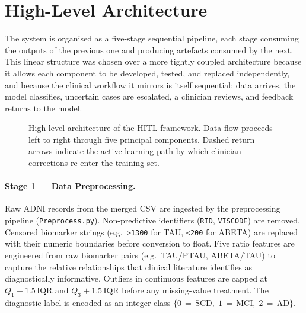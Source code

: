 \documentclass[12pt, a4paper]{report}
\begin{document}
  \section{High-Level Architecture}
  \label{sec:architecture}

  The system is organised as a five-stage sequential pipeline, each stage consuming
  the outputs of the previous one and producing artefacts consumed by the next. This
  linear structure was chosen over a more tightly coupled architecture because it
  allows each component to be developed, tested, and replaced independently, and
  because the clinical workflow it mirrors is itself sequential: data arrives, the
  model classifies, uncertain cases are escalated, a clinician reviews, and feedback
  returns to the model.

  \begin{figure}[htbp]
    \centering
    \caption{High-level architecture of the HITL framework. Data flow proceeds
    left to right through five principal components. Dashed return arrows indicate
    the active-learning path by which clinician corrections re-enter the training set.}
    \label{fig:architecture}
  \end{figure}

  \paragraph{Stage 1 — Data Preprocessing.}
  Raw ADNI records from the merged CSV are ingested by the preprocessing pipeline
  (\texttt{Preprocess.py}). Non-predictive identifiers (\texttt{RID},
  \texttt{VISCODE}) are removed. Censored biomarker strings (e.g.\ \texttt{>1300}
  for TAU, \texttt{<200} for ABETA) are replaced with their numeric boundaries before
  conversion to float. Five ratio features are engineered from raw biomarker pairs
  (e.g.\ TAU/PTAU, ABETA/TAU) to capture the relative relationships that clinical
  literature identifies as diagnostically informative. Outliers in continuous features
  are capped at $Q_1 - 1.5\,\text{IQR}$ and $Q_3 + 1.5\,\text{IQR}$ before any
  missing-value treatment. The diagnostic label is encoded as an integer class
  $\{0\,{=}\,\text{SCD},\; 1\,{=}\,\text{MCI},\; 2\,{=}\,\text{AD}\}$.
\end{document}
